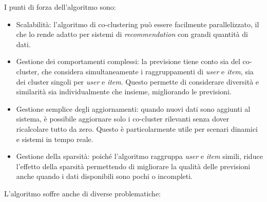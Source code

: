 I punti di forza dell'algoritmo sono:

\begin{itemize}
  \item Scalabilità: l'algoritmo di co-clustering può essere facilmente parallelizzato, il che lo rende adatto per sistemi di \textit{recommendation} con grandi quantità di dati.
  \item Gestione dei comportamenti complessi: la previsione tiene conto sia del co-cluster, che considera simultaneamente i raggruppamenti di \textit{user} e \textit{item}, sia dei cluster singoli per \textit{user} e \textit{item}. Questo permette di considerare diversità e similarità sia individualmente che insieme, migliorando le previsioni.
  \item Gestione semplice degli aggiornamenti: quando nuovi dati sono aggiunti al sistema, è possibile aggiornare solo i co-cluster rilevanti senza dover ricalcolare tutto da zero. Questo è particolarmente utile per scenari dinamici e sistemi in tempo reale.
  \item Gestione della sparsità: poiché l'algoritmo raggruppa \textit{user} e \textit{item} simili, riduce l'effetto della sparsità permettendo di migliorare la qualità delle previsioni anche quando i dati disponibili sono pochi o incompleti.
\end{itemize}

L'algoritmo soffre anche di diverse problematiche:

